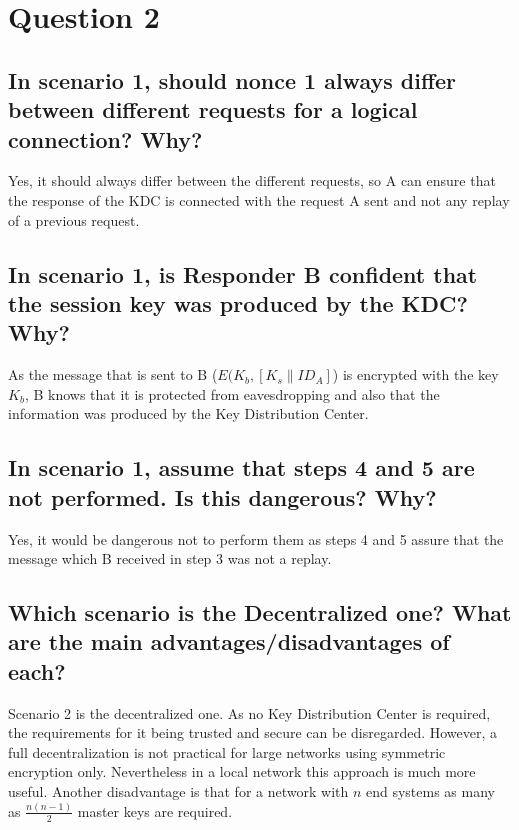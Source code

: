 \documentclass{report}
\begin{document}
	\section{Question 2}
	\startsection
		\renewcommand{\thesubsection}{\thesection.\Alph{subsection}}
		\subsection{In scenario 1, should nonce 1 always differ between different requests for a logical connection? Why?}
		\startsubsection
			Yes, it should always differ between the different requests, so A can ensure that the response of the KDC is connected with the request A sent and not any replay of a previous request.
		\closesection
		\subsection{In scenario 1, is Responder B confident that the session key was produced by the KDC? Why?}
		\startsubsection
			As the message that is sent to B ($E(K_b, [K_s\| ID_A]$) is encrypted with the key $K_b$, B knows that it is protected from eavesdropping and also that the information was produced by the Key Distribution Center.
		\closesection
		\subsection{In scenario 1, assume that steps 4 and 5 are not performed. Is this dangerous? Why?}
		\startsubsection
			Yes, it would be dangerous not to perform them as steps 4 and 5 assure that the message which B received in step 3 was not a replay.
		\closesection
		\subsection{Which scenario is the Decentralized one? What are the main advantages/disadvantages of each?}
		\startsubsection
			Scenario 2 is the decentralized one. As no Key Distribution Center is required, the requirements for it being trusted and secure can be disregarded. However, a full decentralization is not practical for large networks using symmetric encryption only. Nevertheless in a local network this approach is much more useful. Another disadvantage is that for a network with $n$ end systems as many as $\frac{n(n-1)}{2}$ master keys are required.
		\closesection
\end{document}
